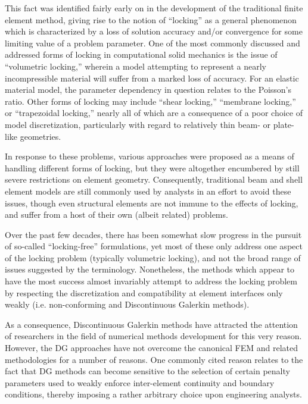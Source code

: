 This fact was identified fairly early on in the development of the traditional finite element method, giving rise to the notion of ``locking'' as a general phenomenon which is characterized by a loss of solution accuracy and/or convergence for some limiting value of a problem parameter. One of the most commonly discussed and addressed forms of locking in computational solid mechanics is the issue of ``volumetric locking,'' wherein a model attempting to represent a nearly incompressible material will suffer from a marked loss of accuracy. For an elastic material model, the parameter dependency in question relates to the Poisson's ratio. Other forms of locking may include ``shear locking,'' ``membrane locking,'' or ``trapezoidal locking,'' nearly all of which are a consequence of a poor choice of model discretization, particularly with regard to relatively thin beam- or plate-like geometries.

In response to these problems, various approaches were proposed as a means of handling different forms of locking, but they were altogether encumbered by still severe restrictions on element geometry. Consequently, traditional beam and shell element models are still commonly used by analysts in an effort to avoid these issues, though even structural elements are not immune to the effects of locking, and suffer from a host of their own (albeit related) problems.

Over the past few decades, there has been somewhat slow progress in the pursuit of so-called ``locking-free'' formulations, yet most of these only address one aspect of the locking problem (typically volumetric locking), and not the broad range of issues suggested by the terminology. Nonetheless, the methods which appear to have the most success almost invariably attempt to address the locking problem by respecting the discretization and compatibility at element interfaces only weakly (i.e. non-conforming and Discontinuous Galerkin methods).

As a consequence, Discontinuous Galerkin methods have attracted the attention of researchers in the field of numerical methods development for this very reason. However, the DG approaches have not overcome the canonical FEM and related methodologies for a number of reasons. One commonly cited reason relates to the fact that DG methods can become sensitive to the selection of certain penalty parameters used to weakly enforce inter-element continuity and boundary conditions, thereby imposing a rather arbitrary choice upon engineering analysts.

